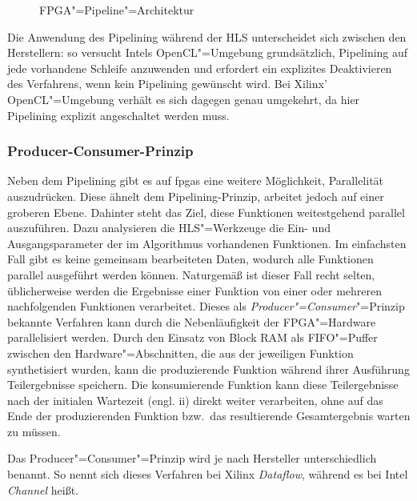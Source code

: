 \begin{figure}[htb]
    \caption{FPGA"=Pipeline"=Architektur \cite[nach][22]{hlsintro2019}}
    \label{fpga:pipelining:pipeline}
\end{figure}

Die Anwendung des Pipelining während der HLS unterscheidet sich zwischen den
Herstellern: so versucht Intels OpenCL"=Umgebung grundsätzlich, Pipelining auf
jede vorhandene Schleife anzuwenden und erfordert ein explizites Deaktivieren
des Verfahrens, wenn kein Pipelining gewünscht wird. Bei Xilinx' OpenCL"=Umgebung
verhält es sich dagegen genau umgekehrt, da hier Pipelining explizit
angeschaltet werden muss.

\subsubsection{Producer-Consumer-Prinzip}

Neben dem Pipelining gibt es auf \gls{fpga}s eine weitere Möglichkeit,
Parallelität auszudrücken. Diese ähnelt dem Pipelining-Prinzip, arbeitet jedoch
auf einer groberen Ebene. Dahinter steht das Ziel, diese Funktionen
weitestgehend parallel auszuführen. Dazu analysieren die HLS"=Werkzeuge die Ein- 
und Ausgangsparameter der im Algorithmus vorhandenen Funktionen. Im einfachsten
Fall gibt es keine gemeinsam bearbeiteten Daten, wodurch alle Funktionen
parallel ausgeführt werden können. Naturgemäß ist dieser Fall recht selten,
üblicherweise werden die Ergebnisse einer Funktion von einer oder mehreren
nachfolgenden Funktionen verarbeitet. Dieses als
\textit{Producer"=Consumer}"=Prinzip bekannte Verfahren kann durch die
Nebenläufigkeit der FPGA"=Hardware parallelisiert werden. Durch den Einsatz von
Block RAM als FIFO"=Puffer zwischen den Hardware"=Abschnitten, die aus der
jeweiligen Funktion synthetisiert wurden, kann die produzierende Funktion
während ihrer Ausführung Teilergebnisse speichern. Die konsumierende Funktion
kann diese Teilergebnisse nach der initialen Wartezeit (engl. \gls{ii}) direkt
weiter verarbeiten, ohne auf das Ende der produzierenden Funktion bzw.\ das
resultierende Gesamtergebnis warten zu müssen. \cite[vgl.][22--23]{hlsintro2019}

Das Producer"=Consumer"=Prinzip wird je nach Hersteller unterschiedlich benannt.
So nennt sich dieses Verfahren bei Xilinx \textit{Dataflow}, während es bei
Intel \textit{Channel} heißt.

